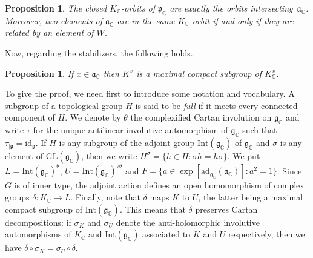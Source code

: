 \documentclass{amsart}
\newtheorem{proposition}[theorem]{Proposition}
\theoremstyle{definition}
\begin{document}
\begin{proposition}
    The closed $K_\mathbb{C}$-orbits of $\mathfrak{p}_\mathbb{C}$ are exactly the orbits intersecting~$\mathfrak{a}_\mathbb{C}$. Moreover, two elements of $\mathfrak{a}_\mathbb{C}$ are in the same $K_\mathbb{C}$-orbit if and only if they are related by an element of $W$.
\end{proposition}

Now, regarding the stabilizers, the following holds.

\begin{proposition} \label{complexstab}
If $x \in \mathfrak{a}_\mathbb{C}$ then $K^x$ is a maximal compact subgroup of $K_\mathbb{C}^x$.
\end{proposition}

To give the proof, we need first to introduce some notation and vocabulary. A subgroup of a topological group $H$ is said to be \textit{full} if it meets every connected component of $H$. We denote by $\theta$ the complexified Cartan involution on $\mathfrak{g}_\mathbb{C}$ and write $\tau$ for the unique antilinear involutive automorphism of $\mathfrak{g}_\mathbb{C}$ such that $\tau_{|\mathfrak{g}} = \mathrm{id}_\mathfrak{g}$. If $H$ is any subgroup of the adjoint group $\mathrm{Int}(\mathfrak{g}_\mathbb{C})$ of $\mathfrak{g}_\mathbb{C}$ and $\sigma$ is any element of $\mathrm{GL}(\mathfrak{g}_\mathbb{C})$, then we write $H^\sigma = \{ h \in H : \sigma h = h \sigma\}$. We put $L = \mathrm{Int}(\mathfrak{g}_\mathbb{C})^\theta$, $U = \mathrm{Int}(\mathfrak{g}_\mathbb{C})^{\tau\theta}$ and $F = \{ a \in \exp[\mathrm{ad}_{\mathfrak{g}_\mathbb{C}} (\mathfrak{a}_\mathbb{C})] : a^2 = 1\}$. Since $G$ is of inner type, the adjoint action defines an open homomorphism of complex groups $\delta : K_\mathbb{C} \to L$. Finally, note that $\delta$ maps $K$ to $U$, the latter being a maximal compact subgroup of $\mathrm{Int}(\mathfrak{g}_\mathbb{C})$. This means that $\delta$ preserves Cartan decompositions: if $\sigma_K$ and $\sigma_U$ denote the anti-holomorphic involutive automorphisms of $K_\mathbb{C}$ and $\mathrm{Int}(\mathfrak{g}_\mathbb{C})$ associated to $K$ and $U$ respectively, then we have $\delta \circ \sigma_K = \sigma_U \circ \delta$.
\end{document}
